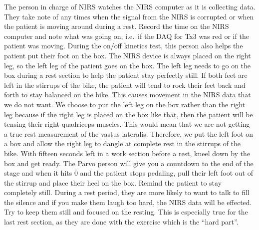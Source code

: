 \documentclass[
]{book}
\begin{document}
The person in charge of NIRS watches the NIRS computer as it is collecting data. They take note of any times when the signal from the NIRS is corrupted or when the patient is moving around during a rest. Record the time on the NIRS computer and note what was going on, i.e.~if the DAQ for Tx3 was red or if the patient was moving. During the on/off kinetics test, this person also helps the patient put their foot on the box. The NIRS device is always placed on the right leg, so the left leg of the patient goes on the box. The left leg needs to go on the box during a rest section to help the patient stay perfectly still. If both feet are left in the stirrups of the bike, the patient will tend to rock their feet back and forth to stay balanced on the bike. This causes movement in the NIRS data that we do not want. We choose to put the left leg on the box rather than the right leg because if the right leg is placed on the box like that, then the patient will be tensing their right quadriceps muscles. This would mean that we are not getting a true rest measurement of the vastus lateralis. Therefore, we put the left foot on a box and allow the right leg to dangle at complete rest in the stirrups of the bike. With fifteen seconds left in a work section before a rest, kneel down by the box and get ready. The Parvo person will give you a countdown to the end of the stage and when it hits 0 and the patient stops pedaling, pull their left foot out of the stirrup and place their heel on the box. Remind the patient to stay completely still. During a rest period, they are more likely to want to talk to fill the silence and if you make them laugh too hard, the NIRS data will be effected. Try to keep them still and focused on the resting. This is especially true for the last rest section, as they are done with the exercise which is the ``hard part''.
\end{document}
